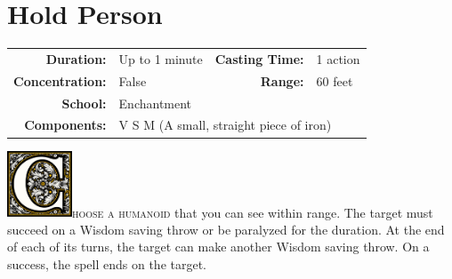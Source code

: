 \documentclass[12pt,showtrims]{memoir}
\begin{document}
\newpage
{}
\newpage
\section*{Hold Person}
{
\small\centering\vspace{-6pt}
\begin{tabular}{rlrl}
\toprule

\textbf{Duration:} & Up to 1 minute &
\textbf{Casting Time:} & 1 action \\
\textbf{Concentration:} & False &
\textbf{Range:} & 60 feet \\
\textbf{School:} & Enchantment \\
\textbf{Components:} & \multicolumn{3}{p{0.7\textwidth}}{V S M (A small, straight piece of iron)}\\

\bottomrule
\end{tabular}
}
\vspace{1\baselineskip}\noindent 
\lettrine[lines=4]{\includegraphics[height=56pt]{initials/C.png}}{hoose a humanoid} that you can see within range. The target must succeed on a Wisdom saving throw or be paralyzed for the duration. At the end of each of its turns, the target can make another Wisdom saving throw. On a success, the spell ends on the target.
\end{document}
